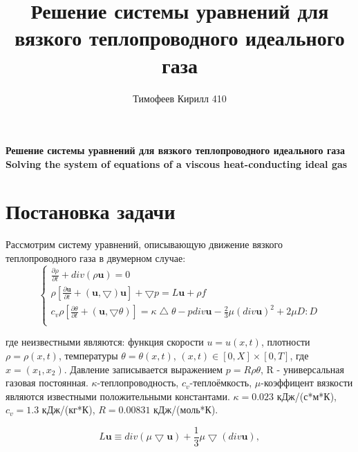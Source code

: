 \documentclass[a4paper]{article}
\theoremstyle{definition}
\numberwithin{equation}{section}
\begin{document}
\begin{titlepage}

\begin{center}


{\Large\bfseries
Решение системы уравнений для вязкого теплопроводного идеального газа\\
Solving the system of equations of a viscous heat-conducting ideal gas\\}
\end{center}


\enlargethispage{4\baselineskip}

\newpage

\end{titlepage}

\title{Решение системы уравнений для вязкого теплопроводного идеального газа}
\author{Тимофеев Кирилл 410}


\newpage
\renewcommand{\contentsname}{Содержание}
\tableofcontents
\newpage
\section{Постановка задачи}

Рассмотрим систему уравнений, описывающую движение вязкого теплопроводного газа в двумерном случае:
$$\begin{cases}
\frac{\partial \rho}{\partial t} + div(\rho \textbf{u}) = 0\\
\rho\left[ \frac{\partial \textbf{u}}{\partial t} + (\textbf{u}, \bigtriangledown)\textbf{u} \right] + \bigtriangledown p = L\textbf{u} + \rho f \\
c_v\rho\left[ \frac{\partial\theta}{\partial t} + (\textbf{u},\bigtriangledown \theta) \right] = \kappa\bigtriangleup \theta - p div \textbf{u}- \frac{2}{3}\mu (div \textbf{u})^2 + 2\mu D:D\\
\end{cases}$$

где неизвестными являются: функция скорости $u=u(x,t)$, плотности $\rho=\rho(x,t)$, температуры $\theta=\theta(x,t)$, $(x,t)\in [0, X] \times [0,T]$, где $x=(x_1,x_2)$. Давление записывается выражением $p=R\rho\theta$, R - универсальная газовая постоянная. $\kappa$-теплопроводность, $c_v$-теплоёмкость, $\mu$-коэффицент вязкости являются известными положительными константами. $\kappa=0.023$ кДж/(с*м*К), $c_v=1.3$ кДж/(кг*К), $R=0.00831$ кДж/(моль*К).

$$L\textbf{u}\equiv div(\mu\bigtriangledown \textbf{u}) + \frac{1}{3}\mu\bigtriangledown (div \textbf{u}),$$
\end{document}
